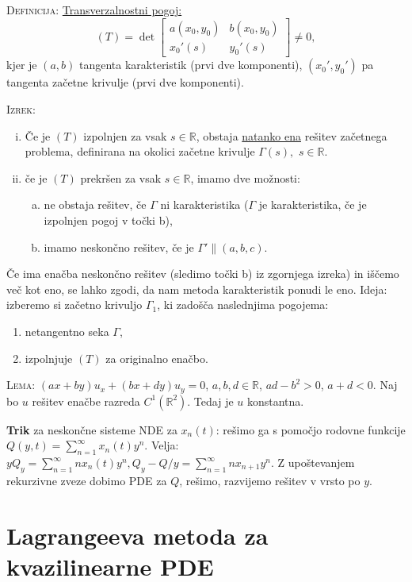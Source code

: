 \documentclass[10pt,a4paper]{amsart}
\theoremstyle{definition} %
\theoremstyle{plain} %
\newcommand{\R}{\mathbb R}
\begin{document}
\textsc{Definicija:} \underline{Transverzalnostni pogoj:} $$ (T) = \det{
  \begin{bmatrix} a(x_0,y_0) & b(x_0,y_0) \\ x_0'(s) & y_0'(s) \end{bmatrix} }
  \neq 0, $$ kjer je $(a,b)$ tangenta karakteristik (prvi dve komponenti),
  $(x_0',y_0')$ pa tangenta začetne krivulje (prvi dve komponenti).

\textsc{Izrek:}
\begin{enumerate}[(i)]
  \item Če je $(T)$ izpolnjen za vsak $s
    \in \R$, obstaja \underline{natanko ena} rešitev začetnega problema,
    definirana na okolici začetne krivulje $\Gamma (s),$ $s \in \R$.
  \item če je $(T)$ prekršen za vsak $s \in \R$, imamo dve možnosti:
    \begin{enumerate}[a)]
      \item ne obstaja rešitev, če $\Gamma$ ni karakteristika ($\Gamma$ je
        karakteristika, če je izpolnjen pogoj v točki b),
      \item imamo neskončno rešitev, če je $\Gamma' \| (a,b,c)$.
    \end{enumerate}
\end{enumerate}

Če ima enačba neskončno rešitev (sledimo točki b) iz zgornjega izreka) in iščemo
več kot eno, se lahko zgodi, da nam metoda karakteristik ponudi le eno. Ideja:
izberemo si začetno krivuljo $\Gamma_1$, ki zadošča naslednjima pogojema:
\begin{enumerate}
  \item netangentno seka $\Gamma$,
  \item izpolnjuje $(T)$ za originalno enačbo.
\end{enumerate}

\textsc{Lema:} $(ax + by) u_x + (bx + dy) u_y = 0$, $a,b,d \in \R$, $ad-b^2 >
0$, $a+d < 0$. Naj bo $u$ rešitev enačbe razreda $C^1 (\R^2)$. Tedaj je $u$
konstantna.

\textbf{Trik} za neskončne sisteme NDE za $x_n(t)$: rešimo ga s pomočjo rodovne
funkcije $Q(y,t) = \sum_{n=1}^\infty x_n(t) y^n$. Velja: $yQ_y =
\sum_{n=1}^\infty nx_n(t)y^n, Q_y - Q / y = \sum_{n=1}^\infty nx_{n+1}y^n$.
Z upoštevanjem rekurzivne zveze dobimo PDE za $Q$, rešimo, razvijemo rešitev v
vrsto po $y$.

\section*{Lagrangeeva metoda za kvazilinearne PDE}
\end{document}
